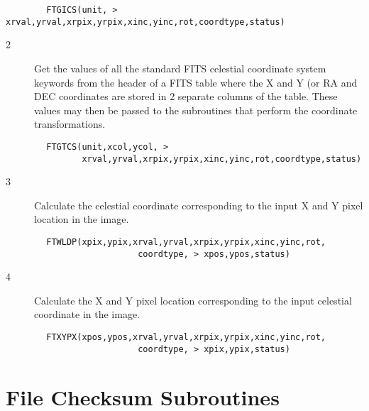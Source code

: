 \documentclass[11pt]{book}
\begin{document}
\begin{verbatim}
        FTGICS(unit, > xrval,yrval,xrpix,yrpix,xinc,yinc,rot,coordtype,status)
\end{verbatim}

\begin{description}
\item[2 ] Get the values of all the standard FITS celestial coordinate system
    keywords from the header of a FITS table where the X and Y (or RA and
    DEC coordinates are stored in 2 separate columns of the table.
    These values may then be passed to the subroutines that perform the
   coordinate transformations.
\end{description}

\begin{verbatim}
        FTGTCS(unit,xcol,ycol, >
               xrval,yrval,xrpix,yrpix,xinc,yinc,rot,coordtype,status)
\end{verbatim}

\begin{description}
\item[3 ]  Calculate the celestial coordinate corresponding to the input
    X and Y pixel location in the image.
\end{description}

\begin{verbatim}
        FTWLDP(xpix,ypix,xrval,yrval,xrpix,yrpix,xinc,yinc,rot,
                          coordtype, > xpos,ypos,status)
\end{verbatim}

\begin{description}
\item[4 ]  Calculate the X and Y pixel location corresponding to the input
    celestial coordinate in the image.
\end{description}

\begin{verbatim}
        FTXYPX(xpos,ypos,xrval,yrval,xrpix,yrpix,xinc,yinc,rot,
                          coordtype, > xpix,ypix,status)
\end{verbatim}


\section{File Checksum Subroutines \label{FTPCKS}}
\end{document}
